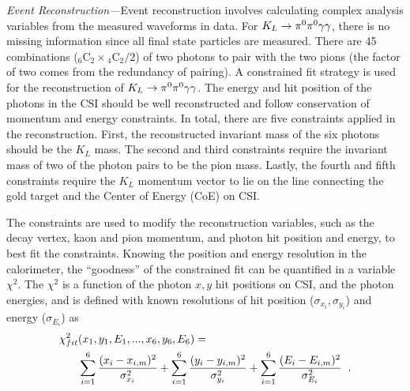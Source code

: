 \documentclass[twocolumn, superscriptaddress, aps,prl]{revtex4-2}
\newcommand{\mycomment}[1]{}
\begin{document}
\textit{Event Reconstruction---}Event reconstruction involves calculating complex analysis variables from the measured waveforms in data. For $K_L \rightarrow \pi^0 \pi^0 \gamma \gamma$, there is no missing information since all final state particles are measured. There are 45 combinations ($_6\text{C}_2 \times {}_4\text{C}_2/2$) of two photons to pair with the two pions
(the factor of two comes from the redundancy of pairing). A constrained fit strategy is used for the reconstruction of $K_L \rightarrow \pi^0 \pi^0 \gamma \gamma$. The energy and hit position of the photons in the CSI should be well reconstructed and follow conservation of momentum and energy constraints. In total, there are five constraints applied in the reconstruction. First, the reconstructed invariant mass of the six photons should be the $K_L$ mass. The second and third constraints require the invariant mass of two of the photon pairs to be the pion mass. Lastly, the fourth and fifth constraints require the $K_L$ momentum vector to lie on the line connecting the gold target and the Center of Energy (CoE) on CSI.
\mycomment{The process for this reconstruction is done in two stages. In the first stage, the reconstructed hit positions and energies of photons in the CSI are calculated, and the pion decay vertex is obtained by assuming the pion mass for each of the two pions as
\begin{equation}
    M_{\pi^0}^2 = 2E_1E_2(1-\cos\theta),
    \label{eq:pion_mass}
\end{equation}
where $E_1$ and $E_2$ represent the energy of the paired photons, and $\theta$ is the opening angle between them. The preliminary $K_L$ decay vertex is the average of reconstructed pion vertices on the beam-axis, and the kinematics of the pions and kaon are reconstructed under this assumption.}
The constraints are used to modify the reconstruction variables, such as the decay vertex, kaon and pion momentum, and photon hit position and energy, to best fit the constraints. Knowing the position and energy resolution in the calorimeter, the ``goodness'' of the constrained fit can be quantified in a variable $\chi^2$. The $\chi^2$ is a function of the photon $x,y$ hit positions on CSI, and the photon energies, and is defined with known resolutions of hit position ($\sigma_{x_i}, \sigma_{y_i}$) and energy ($\sigma_{E_i}$) as
{\small
\begin{align}
    \chi^2_{fit}&(x_1,y_1,E_1,...,x_6,y_6,E_6) = \notag \\ &\sum_{i=1}^6\frac{(x_i - x_{i,m})^2}{\sigma_{x_i}^2} +\sum_{i=1}^6\frac{(y_i - y_{i,m})^2}{\sigma_{y_i}^2} + \sum_{i=1}^6\frac{(E_i - E_{i,m})^2}{\sigma_{E_i}^2} \hspace{0.2cm}.
    \label{eq:chisq_function}
\end{align}}
\end{document}
